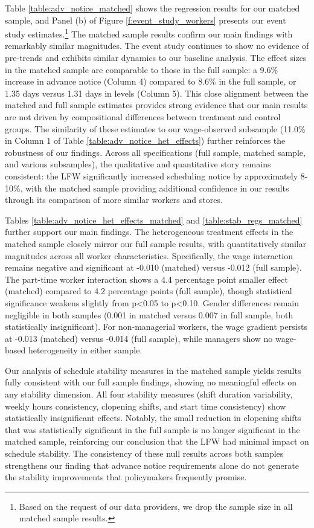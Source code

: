 \documentclass[letterpaper,11pt,leqno]{article}
\theoremstyle{paper}
\begin{document}
Table \ref{table:adv_notice_matched} shows the regression results for our matched sample, and Panel (b) of Figure \ref{f:event_study_workers} presents our event study estimates.\footnote{Based on the request of our data providers, we drop the sample size in all matched sample results.} The matched sample results confirm our main findings with remarkably similar magnitudes. The event study continues to show no evidence of pre-trends and exhibits similar dynamics to our baseline analysis. The effect sizes in the matched sample are comparable to those in the full sample: a 9.6\% increase in advance notice (Column 4) compared to 8.6\% in the full sample, or 1.35 days versus 1.31 days in levels (Column 5). This close alignment between the matched and full sample estimates provides strong evidence that our main results are not driven by compositional differences between treatment and control groups. The similarity of these estimates to our wage-observed subsample (11.0\% in Column 1 of Table \ref{table:adv_notice_het_effects}) further reinforces the robustness of our findings. Across all specifications (full sample, matched sample, and various subsamples), the qualitative and quantitative story remains consistent: the LFW significantly increased scheduling notice by approximately 8-10\%, with the matched sample providing additional confidence in our results through its comparison of more similar workers and stores.

Tables \ref{table:adv_notice_het_effects_matched} and \ref{table:stab_regs_matched} further support our main findings. The heterogeneous treatment effects in the matched sample closely mirror our full sample results, with quantitatively similar magnitudes across all worker characteristics. Specifically, the wage interaction remains negative and significant at -0.010 (matched) versus -0.012 (full sample). The part-time worker interaction shows a 4.4 percentage point smaller effect (matched) compared to 4.2 percentage points (full sample), though statistical significance weakens slightly from p<0.05 to p<0.10. Gender differences remain negligible in both samples (0.001 in matched versus 0.007 in full sample, both statistically insignificant). For non-managerial workers, the wage gradient persists at -0.013 (matched) versus -0.014 (full sample), while managers show no wage-based heterogeneity in either sample. 

Our analysis of schedule stability measures in the matched sample yields results fully consistent with our full sample findings, showing no meaningful effects on any stability dimension. All four stability measures (shift duration variability, weekly hours consistency, clopening shifts, and start time consistency) show statistically insignificant effects. Notably, the small reduction in clopening shifts that was statistically significant in the full sample is no longer significant in the matched sample, reinforcing our conclusion that the LFW had minimal impact on schedule stability. The consistency of these null results across both samples strengthens our finding that advance notice requirements alone do not generate the stability improvements that policymakers frequently promise.
\end{document}
